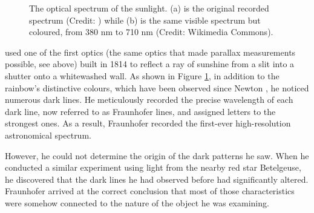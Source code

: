 \begin{figure}[!htb]
    \centering
    \vfill
    \vfill
    \caption{The optical spectrum of the sunlight. (a) is the original recorded spectrum (Credit: \citet{fraunhofer_first_1817}) while (b) is the same visible spectrum but coloured, from 380 nm to 710 nm (Credit: Wikimedia Commons).} 
    \label{fig:Fraunhofer_lines}
\end{figure}

\citet{fraunhofer_first_1817} used one of the first optics (the same optics that made parallax measurements possible, see above) built in 1814 to reflect a ray of sunshine from a slit into a shutter onto a whitewashed wall. As shown in Figure \ref{fig:Fraunhofer_lines}, in addition to the rainbow's distinctive colours, which have been observed since Newton \cite{newton_new_1993}, he noticed numerous dark lines. He meticulously recorded the precise wavelength of each dark line, now referred to as Fraunhofer lines, and assigned letters to the strongest ones. As a result, Fraunhofer recorded the first-ever high-resolution astronomical spectrum.

However, he could not determine the origin of the dark patterns he saw. When he conducted a similar experiment using light from the nearby red star Betelgeuse, he discovered that the dark lines he had observed before had significantly altered. Fraunhofer arrived at the correct conclusion that most of those characteristics were somehow connected to the nature of the object he was examining.

